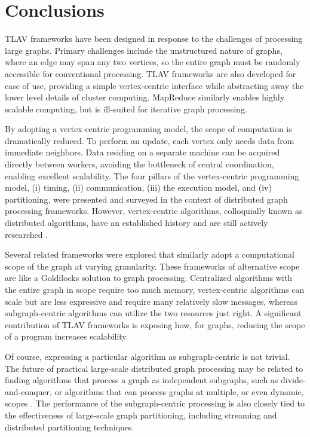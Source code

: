 \documentclass[reprint,twocolumn,showpacs,preprintnumbers,amsmath, aps,pre,amssymb]{revtex4-1}
\begin{document}
\section{Conclusions}
\label{sec:conc}

TLAV frameworks have been designed in response to the challenges of processing large graphs.  Primary challenges include the unstructured nature of graphs, where an edge may span any two vertices, so the entire graph must be randomly accessible for conventional processing.  TLAV frameworks are also developed for ease of use, providing a simple vertex-centric interface while abstracting away the lower level details of cluster computing.  MapReduce similarly enables highly scalable computing, but is ill-suited for iterative graph processing.

By adopting a vertex-centric programming model, the scope of computation is dramatically reduced.  To perform an update, each vertex only needs data from immediate neighbors.  Data residing on a separate machine can be acquired directly between workers, avoiding the bottleneck of central coordination, enabling excellent scalability.  The four pillars of the vertex-centric programming model, (i) timing, (ii) communication, (iii) the execution model, and (iv) partitioning, were presented and surveyed in the context of distributed graph processing frameworks.  However, vertex-centric algorithms, colloquially known as distributed algorithms, have an established history and are still actively researched \cite{Lynch1996,kuhn2010}.

Several related frameworks were explored that similarly adopt a computational scope of the graph at varying granularity.  These frameworks of alternative scope are like a Goldilocks solution to graph processing.  Centralized algorithms with the entire graph in scope require too much memory, vertex-centric algorithms can scale but are less expressive and require many relatively slow messages, whereas subgraph-centric algorithms can utilize the two resources just right.  A significant contribution of TLAV frameworks is exposing how, for graphs, reducing the scope of a program increases scalability.  

Of course, expressing a particular algorithm as subgraph-centric is not trivial.  The future of practical large-scale distributed graph processing may be related to finding algorithms that process a graph as independent subgraphs, such as divide-and-conquer, or algorithms that can process graphs at multiple, or even dynamic, scopes \cite{Wang2014}.  The performance of the subgraph-centric processing is also closely tied to the effectiveness of large-scale graph partitioning, including streaming and distributed partitioning techniques.
\end{document}
